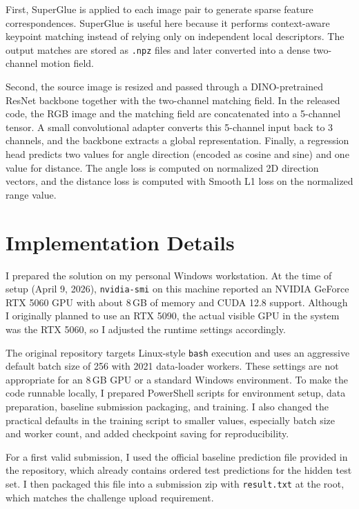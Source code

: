 \documentclass[sigconf]{acmart}
\begin{document}
First, SuperGlue is applied to each image pair to generate sparse feature correspondences. SuperGlue is useful here because it performs context-aware keypoint matching instead of relying only on independent local descriptors. The output matches are stored as \texttt{.npz} files and later converted into a dense two-channel motion field.

Second, the source image is resized and passed through a DINO-pretrained ResNet backbone together with the two-channel matching field. In the released code, the RGB image and the matching field are concatenated into a 5-channel tensor. A small convolutional adapter converts this 5-channel input back to 3 channels, and the backbone extracts a global representation. Finally, a regression head predicts two values for angle direction (encoded as cosine and sine) and one value for distance. The angle loss is computed on normalized 2D direction vectors, and the distance loss is computed with Smooth L1 loss on the normalized range value.

\section{Implementation Details}
I prepared the solution on my personal Windows workstation. At the time of setup (April 9, 2026), \texttt{nvidia-smi} on this machine reported an NVIDIA GeForce RTX 5060 GPU with about 8\,GB of memory and CUDA 12.8 support. Although I originally planned to use an RTX 5090, the actual visible GPU in the system was the RTX 5060, so I adjusted the runtime settings accordingly.

The original repository targets Linux-style \texttt{bash} execution and uses an aggressive default batch size of 256 with 2021 data-loader workers. These settings are not appropriate for an 8\,GB GPU or a standard Windows environment. To make the code runnable locally, I prepared PowerShell scripts for environment setup, data preparation, baseline submission packaging, and training. I also changed the practical defaults in the training script to smaller values, especially batch size and worker count, and added checkpoint saving for reproducibility.

For a first valid submission, I used the official baseline prediction file provided in the repository, which already contains ordered test predictions for the hidden test set. I then packaged this file into a submission zip with \texttt{result.txt} at the root, which matches the challenge upload requirement.
\end{document}
